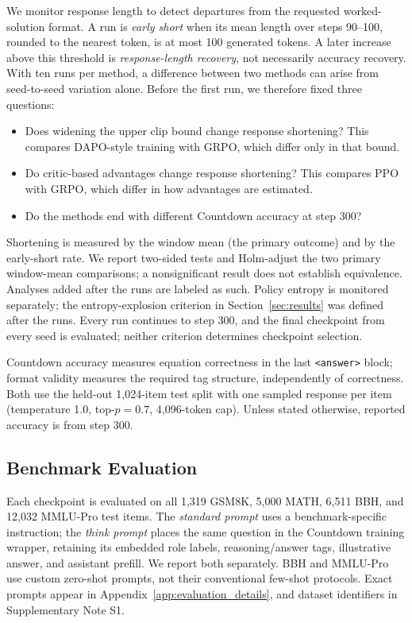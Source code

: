 \documentclass[ai,article,submit,oneauthor]{Definitions/mdpi}
\begin{document}
We monitor response length to detect departures from the requested worked-solution format. A run is \emph{early short} when its mean length over steps 90--100, rounded to the nearest token, is at most 100 generated tokens. A later increase above this threshold is \emph{response-length recovery}, not necessarily accuracy recovery. With ten runs per method, a difference between two methods can arise from seed-to-seed variation alone. Before the first run, we therefore fixed three questions:
\begin{itemize}[leftmargin=2.5em,labelwidth=2em]
\item[Q1.] Does widening the upper clip bound change response shortening? This compares DAPO-style training with GRPO, which differ only in that bound.
\item[Q2.] Do critic-based advantages change response shortening? This compares PPO with GRPO, which differ in how advantages are estimated.
\item[Q3.] Do the methods end with different Countdown accuracy at step 300?
\end{itemize}
Shortening is measured by the window mean (the primary outcome) and by the early-short rate. We report two-sided tests and Holm-adjust the two primary window-mean comparisons; a nonsignificant result does not establish equivalence. Analyses added after the runs are labeled as such. Policy entropy is monitored separately; the entropy-explosion criterion in Section~\ref{sec:results} was defined after the runs. Every run continues to step 300, and the final checkpoint from every seed is evaluated; neither criterion determines checkpoint selection.

Countdown accuracy measures equation correctness in the last \texttt{<answer>} block; format validity measures the required tag structure, independently of correctness. Both use the held-out 1,024-item test split with one sampled response per item (temperature 1.0, top-$p=0.7$, 4,096-token cap). Unless stated otherwise, reported accuracy is from step 300.

\subsection{Benchmark Evaluation}\label{sec:eval_protocol}

Each checkpoint is evaluated on all 1,319 GSM8K, 5,000 MATH, 6,511 BBH, and 12,032 MMLU-Pro test items. The \emph{standard prompt} uses a benchmark-specific instruction; the \emph{think prompt} places the same question in the Countdown training wrapper, retaining its embedded role labels, reasoning/answer tags, illustrative answer, and assistant prefill. We report both separately. BBH and MMLU-Pro use custom zero-shot prompts, not their conventional few-shot protocols. Exact prompts appear in Appendix~\ref{app:evaluation_details}, and dataset identifiers in Supplementary Note S1.
\end{document}
